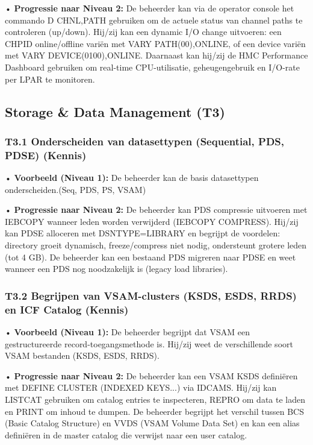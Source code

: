 • \textbf{Progressie naar Niveau 2:} De beheerder kan via de operator console het commando {D CHNL,PATH} gebruiken om de actuele status van channel paths te controleren (up/down). Hij/zij kan een dynamic I/O change uitvoeren: een CHPID online/offline variën met {VARY PATH(00),ONLINE}, of een device variën met {VARY DEVICE(0100),ONLINE}. Daarnaast kan hij/zij de HMC Performance Dashboard gebruiken om real-time CPU-utilisatie, geheugengebruik en I/O-rate per LPAR te monitoren.

\subsection{Storage \& Data Management (T3)}

\subsubsection{T3.1 Onderscheiden van datasettypen (Sequential, PDS, PDSE) (Kennis)}

• \textbf{Voorbeeld (Niveau 1):} De beheerder kan de basis datasettypen onderscheiden.(Seq, PDS, PS, VSAM)

• \textbf{Progressie naar Niveau 2:} De beheerder kan PDS compressie uitvoeren met IEBCOPY wanneer leden worden verwijderd ({IEBCOPY COMPRESS}). Hij/zij kan PDSE alloceren met {DSNTYPE=LIBRARY} en begrijpt de voordelen: directory groeit dynamisch, freeze/compress niet nodig, ondersteunt grotere leden (tot 4 GB). De beheerder kan een bestaand PDS migreren naar PDSE en weet wanneer een PDS nog noodzakelijk is (legacy load libraries).

\subsubsection{T3.2 Begrijpen van VSAM-clusters (KSDS, ESDS, RRDS) en ICF Catalog (Kennis)}

• \textbf{Voorbeeld (Niveau 1):} De beheerder begrijpt dat {VSAM} een gestructureerde record-toegangsmethode is. Hij/zij weet de verschillende soort VSAM bestanden (KSDS, ESDS, RRDS).

• \textbf{Progressie naar Niveau 2:} De beheerder kan een VSAM KSDS definiëren met {DEFINE CLUSTER (INDEXED KEYS...)} via IDCAMS. Hij/zij kan {LISTCAT} gebruiken om catalog entries te inspecteren, {REPRO} om data te laden en {PRINT} om inhoud te dumpen. De beheerder begrijpt het verschil tussen BCS (Basic Catalog Structure) en VVDS (VSAM Volume Data Set) en kan een alias definiëren in de master catalog die verwijst naar een user catalog.

